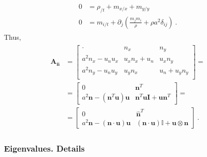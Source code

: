 \documentclass[letterpaper,10pt,english]{jupyterBook}
\begin{document}
\begin{equation*}
\begin{split}\begin{aligned}
  0 & = \rho_{/t} + m_{x/x} + m_{y/y}  \\
  0 & = m_{i/t} + \partial_{j} \left( \frac{m_j m_i}{\rho} + \rho a^2 \delta_{ij} \right) \ .
\end{aligned}\end{split}
\end{equation*}
\sphinxAtStartPar
Thus,
\begin{equation*}
\begin{split}\begin{aligned}
\mathbf{A}_{\hat{\mathbf{n}}} 
& = 
\begin{bmatrix} 
  \cdot & n_x & n_y \\
  a^2 n_x - u_n u_x & u_x n_x + u_n & u_x n_y \\
  a^2 n_y - u_n u_y & u_y n_x & u_n + u_y n_y \\
\end{bmatrix} = \\
& = 
\begin{bmatrix}
  0 & \mathbf{n}^T \\
  a^2 \mathbf{n} - ( \mathbf{n}^T \mathbf{u} ) \mathbf{u} &  \mathbf{n}^T \mathbf{u} \mathbf{I} + \mathbf{u} \mathbf{n}^T
\end{bmatrix} = \\
& = 
\begin{bmatrix}
  0 & \hat{\mathbf{n}}^T \\
  a^2 \mathbf{n} - ( \mathbf{n} \cdot \mathbf{u} ) \mathbf{u} & ( \mathbf{n} \cdot \mathbf{u} ) \mathbb{I} + \mathbf{u} \otimes \mathbf{n}
\end{bmatrix} \ .
\end{aligned}\end{split}
\end{equation*}\subsubsection*{Eigenvalues. Details}
\end{document}
